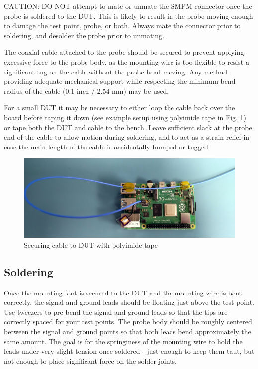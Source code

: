\documentclass[11pt]{article}
\begin{document}
CAUTION: DO NOT attempt to mate or unmate the SMPM connector once the probe is soldered to the DUT. This is likely
to result in the probe moving enough to damage the test point, probe, or both. Always mate the connector prior to
soldering, and desolder the probe prior to unmating.

The coaxial cable attached to the probe should be secured to prevent applying excessive force to the probe body, as the
mounting wire is too flexible to resist a significant tug on the cable without the probe head moving. Any method
providing adequate mechanical support while respecting the minimum bend radius of the cable (0.1 inch / 2.54 mm) may be
used.

For a small DUT it may be necessary to either loop the cable back over the board before taping it down (see example
setup using polyimide tape in Fig. \ref{cable-secured}) or tape both the DUT and cable to the bench. Leave sufficient
slack at the probe end of the cable to allow motion during soldering, and to act as a strain relief in case the main
length of the cable is accidentally bumped or tugged.

\begin{figure}[h]
\centering
\includegraphics[width=12cm]{cable-tape.jpg}
\caption{Securing cable to DUT with polyimide tape}
\label{cable-secured}
\end{figure}

\FloatBarrier

\subsection{Soldering}

Once the mounting foot is secured to the DUT and the mounting wire is bent correctly, the signal and ground leads
should be floating just above the test point. Use tweezers to pre-bend the signal and ground leads so that the tips are
correctly spaced for your test points. The probe body should be roughly centered between the signal and ground points
so that both leads bend approximately the same amount. The goal is for the springiness of the mounting wire to hold the
leads under very slight tension once soldered - just enough to keep them taut, but not enough to place significant
force on the solder joints.
\end{document}
